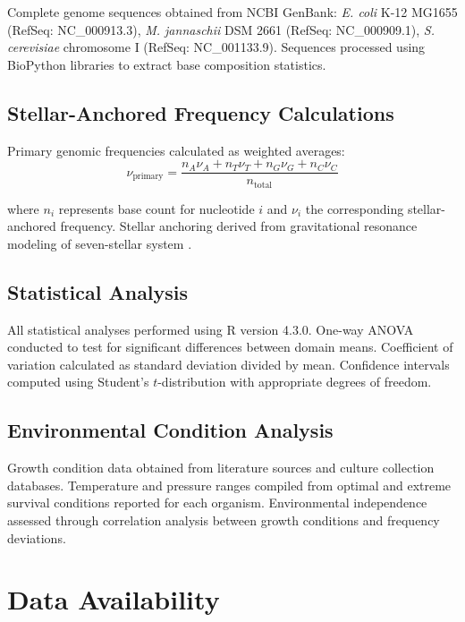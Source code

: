 \documentclass[9pt,twocolumn,twoside,lineno]{pnas-new}
\begin{document}
Complete genome sequences obtained from NCBI GenBank: \textit{E. coli} K-12 MG1655 (RefSeq: NC\_000913.3), \textit{M. jannaschii} DSM 2661 (RefSeq: NC\_000909.1), \textit{S. cerevisiae} chromosome I (RefSeq: NC\_001133.9). Sequences processed using BioPython libraries to extract base composition statistics.

\subsection*{Stellar-Anchored Frequency Calculations}

Primary genomic frequencies calculated as weighted averages:
\begin{equation}
\nu_{\text{primary}} = \frac{n_A \nu_A + n_T \nu_T + n_G \nu_G + n_C \nu_C}{n_{\text{total}}}
\end{equation}

where $n_i$ represents base count for nucleotide $i$ and $\nu_i$ the corresponding stellar-anchored frequency. Stellar anchoring derived from gravitational resonance modeling of seven-stellar system \cite{russell_stellar_2025}.

\subsection*{Statistical Analysis}

All statistical analyses performed using R version 4.3.0. One-way ANOVA conducted to test for significant differences between domain means. Coefficient of variation calculated as standard deviation divided by mean. Confidence intervals computed using Student's $t$-distribution with appropriate degrees of freedom.

\subsection*{Environmental Condition Analysis}

Growth condition data obtained from literature sources and culture collection databases. Temperature and pressure ranges compiled from optimal and extreme survival conditions reported for each organism. Environmental independence assessed through correlation analysis between growth conditions and frequency deviations.

\section*{Data Availability}
\end{document}
